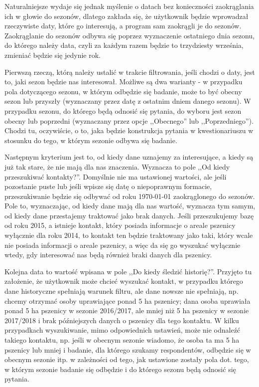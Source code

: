 \documentclass[12pt, twoside, hidelinks]{report}
\begin{document}
Naturalniejsze wydaje się jednak myślenie o datach bez konieczności zaokrąglania ich w głowie do sezonów, dlatego zakłada się, że użytkownik będzie wprowadzał rzeczywiste daty, które go interesują, a program sam zaokrągli je do sezonów. Zaokrąglanie do sezonów odbywa się poprzez wyznaczenie ostatniego dnia sezonu, do którego należy data, czyli za każdym razem będzie to trzydziesty września, zmieniać będzie się jedynie rok. \par
Pierwszą rzeczą, którą należy ustalić w trakcie filtrowania, jeśli chodzi o daty, jest to, jaki sezon będzie nas interesował. Możliwe są dwa warianty - w przypadku pola dotyczącego sezonu, w którym odbędzie się badanie, może to być obecny sezon lub przyszły (wyznaczany przez datę z ostatnim dniem danego sezonu). W przypadku sezonu, do którego będą odnosić się pytania, do wyboru jest sezon obecny lub poprzedni (wyznaczany przez opcje ,,Obecnego'' lub ,,Poprzedniego''). Chodzi tu, oczywiście, o to, jaka będzie konstrukcja pytania w kwestionariuszu w stosunku do tego, w którym sezonie odbywa się badanie. \par
Następnym kryterium jest to, od kiedy dane uznajemy za interesujące, a kiedy są już tak stare, że nie mają dla nas znaczenia. Wyznacza to pole ,,Od kiedy przeszukiwać kontakty?''. Domyślnie nie ma ustawionej wartości, ale jeśli pozostanie puste lub jeśli wpisze się datę o niepoprawnym formacie, przeszukiwanie będzie się odbywać od roku 1970-01-01 zaokrąglonego do sezonów. Pole to, wyznaczając, od kiedy dane mają dla nas wartość, wyznacza tym samym, od kiedy dane przestajemy traktować jako brak danych. Jeśli przeszukujemy bazę od roku 2015, a istnieje kontakt, który posiada informacje o areale pszenicy wyłącznie dla roku 2014, to kontakt ten będzie traktowany jako taki, który wcale nie posiada informacji o areale pszenicy, a więc da się go wyszukać wyłącznie wtedy, gdy interesować nas będą również braki danych dla pszenicy. \par
Kolejna data to wartość wpisana w pole ,,Do kiedy śledzić historię?''. Przyjęto tu założenie, że użytkownik może chcieć wyszukać kontakt, w przypadku którego dane historyczne spełniają warunek filtru, ale dane nowsze nie spełniają, np. chcemy otrzymać osoby uprawiające ponad 5 ha pszenicy; dana osoba uprawiała ponad 5 ha pszenicy w sezonie 2016/2017, ale mniej niż 5 ha pszenicy w sezonie 2017/2018 i brak późniejszych danych o pszenicy dla tego kontaktu. W kilku przypadkach wyszukiwanie, mimo odpowiednich ustawień, może nie odnaleźć takiego kontaktu, np. jeśli w obecnym sezonie wiadomo, że osoba ta ma 5 ha pszenicy lub mniej i badanie, dla którego szukamy respondentów, odbędzie się w obecnym sezonie itp. w zależności od tego, jak ustawione zostały pola dot. tego, w którym sezonie badanie się odbędzie i do którego sezonu będą odnosić się pytania.  \par
\end{document}
